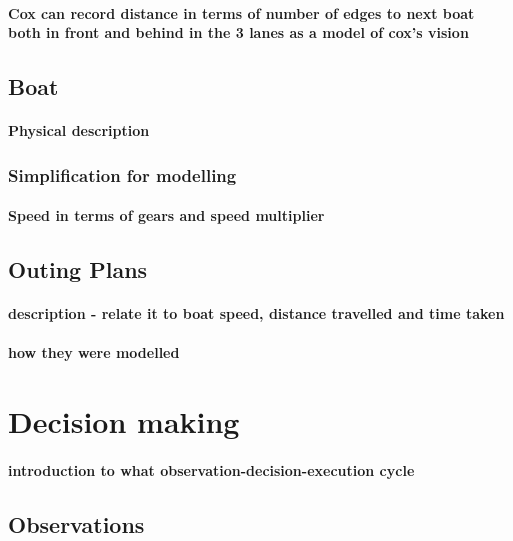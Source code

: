         \paragraph{Cox can record distance in terms of number of edges to next boat both in front and behind in the 3 lanes as a model of cox's vision}
        
    \subsection{Boat}
      \paragraph{Physical description}
      \subsubsection{Simplification for modelling}
        \paragraph{Speed in terms of gears and speed multiplier}
        

    
    \subsection{Outing Plans}
      \paragraph{description - relate it to boat speed, distance travelled and time taken}
      \paragraph{how they were modelled}
    
  \section{Decision making}
    \paragraph{introduction to what observation-decision-execution cycle}

    \subsection{Observations}
